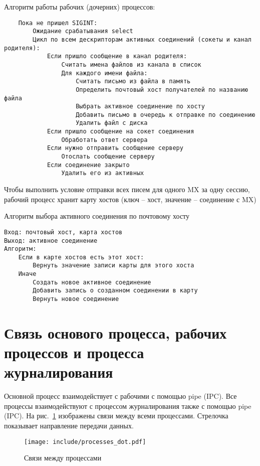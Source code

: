\documentclass[a4paper,12pt]{report}
\begin{document}
Алгоритм работы рабочих (дочерних) процессов:

\begin{verbatim}
    Пока не пришел SIGINT:
        Ожидание срабатывания select
        Цикл по всем дескрипторам активных соединений (сокеты и канал родителя):
            Если пришло сообщение в канал родителя:
                Считать имена файлов из канала в список
                Для каждого имени файла:
                    Считать письмо из файла в память
                    Определить почтовый хост получателей по названию файла
                    Выбрать активное соединение по хосту
                    Добавить письмо в очередь к отправке по соединению
                    Удалить файл с диска
            Если пришло сообщение на сокет соединения
                Обработать ответ сервера
            Если нужно отправить сообщение серверу
                Отослать сообщение серверу
            Если соединение закрыто
                Удалить его из активных
\end{verbatim}

Чтобы выполнить условие отправки всех писем для одного MX за одну сессию, рабочий процесс хранит карту хостов (ключ -- хост, значение -- соединение с MX)

Алгоритм выбора активного соединения по почтовому хосту
\begin{verbatim}
Вход: почтовый хост, карта хостов
Выход: активное соединение
Алгоритм:
    Если в карте хостов есть этот хост:
        Вернуть значение записи карты для этого хоста
    Иначе
        Создать новое активное соединение
        Добавить запись о созданном соединении в карту
        Вернуть новое соединение
\end{verbatim}


\section{Связь основого процесса, рабочих процессов и процесса журналирования}

Основной процесс взаимодействует с рабочими с помощью pipe (IPC). Все процессы взаимодействуют с процессом журналирования также с помощью pipe (IPC). На рис.~\ref{fig:comm} изображены связи между всеми процессами. Стрелочка показывает направление передачи данных. 

\begin{figure}[h]
    \centering
    \texttt{[image: include/processes\_dot.pdf]}
    \caption{Связи между процессами}
    \label{fig:comm}
\end{figure}
\end{document}
